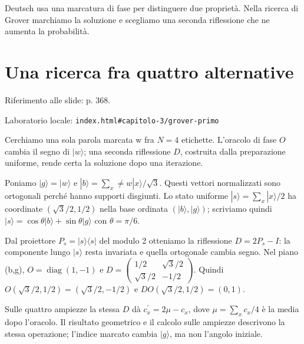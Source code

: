 Deutsch usa una marcatura di fase per distinguere due proprietà. Nella ricerca di Grover marchiamo la soluzione e scegliamo una seconda riflessione che ne aumenta la probabilità.\par



\Needspace{.43\textheight}
\section{Una ricerca fra quattro alternative}
\label{c3-grover-primo}

{\sffamily\small\color{Ink!70} Riferimento alle slide: p. 368.\par}

{\sffamily\small\color{Ink!70} Laboratorio locale: \nolinkurl{index.html#capitolo-3/grover-primo}\par}

Cerchiamo una sola parola marcata w fra \(N=4\) etichette. L'oracolo di fase \(O\) cambia il segno di \(|w\rangle \); una seconda riflessione \(D\), costruita dalla preparazione uniforme, rende certa la soluzione dopo una iterazione.\par

Poniamo \(|g\rangle =|w\rangle \) e \(|b\rangle =\sum _{x}\ne w|x\rangle /\sqrt{3}\). Questi vettori normalizzati sono ortogonali perché hanno supporti disgiunti. Lo stato uniforme \(|s\rangle =\sum _{x}|x\rangle /2\) ha coordinate \((\sqrt{3}/2{,}1/2)\) nella base ordinata \((|b\rangle ,\allowbreak |g\rangle )\); scriviamo quindi \(|s\rangle =\cos \theta |b\rangle +\sin \theta |g\rangle \) con \(\theta =\pi /6\).\par

Dal proiettore \(P_{s}=|s\rangle \langle s|\) del modulo 2 otteniamo la riflessione \(D=2P_{s}- I\): la componente lungo \(|s\rangle \) resta invariata e quella ortogonale cambia segno. Nel piano (b,g), \(O=\operatorname{diag}(1,\allowbreak - 1)\) e \(D=\)\(\begin{pmatrix}1/2&\sqrt{3}/2\\\sqrt{3}/2&- 1/2\end{pmatrix}\). Quindi \(O(\sqrt{3}/2{,}1/2)=(\sqrt{3}/2,\allowbreak - 1/2)\) e \(DO(\sqrt{3}/2{,}1/2)=(0{,}1)\).\par

Sulle quattro ampiezze la stessa \(D\) dà \(c{}^{\prime} _{x}=2\mu - c_{x}\), dove \(\mu =\sum _{x}c_{x}/4\) è la media dopo l'oracolo. Il risultato geometrico e il calcolo sulle ampiezze descrivono la stessa operazione; l'indice marcato cambia \(|g\rangle \), ma non l'angolo iniziale.\par


